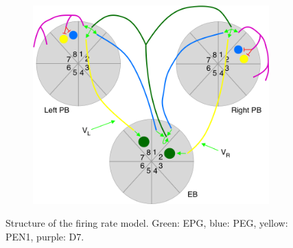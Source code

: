 \documentclass{article}
\begin{document}
\begin{figure}[h]
	\centering
	\begin{subfigure}[t]{0.43\linewidth}
		\centering
		\includegraphics[width = 1.0\linewidth, trim={0 0 0 0}, clip=true]{../figures/model_structure.png}
	\end{subfigure}
\caption{Structure of the firing rate model. Green: EPG, blue: PEG, yellow: PEN1, purple: D7.}
\label{fig:struc}
\end{figure}
\end{document}
